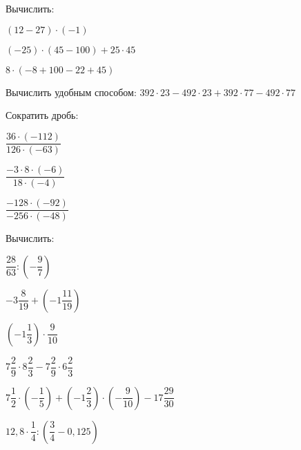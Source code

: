 \begin{listofex}
	\item Вычислить:
	\begin{enumcols}[itemcolumns=3]
		\item \( (12-27)\cdot(-1) \)
		\item \( (-25)\cdot(45-100)+25\cdot45 \)
		\item \( 8\cdot(-8+100-22+45) \)
	\end{enumcols}
	\item Вычислить удобным способом: \( 392\cdot23-492\cdot23+392\cdot77-492\cdot77 \)
	\item Сократить дробь:
	\begin{enumcols}[itemcolumns=3]
		\item \( \dfrac{36\cdot(-112)}{126\cdot(-63)} \)
		\item \( \dfrac{-3\cdot8\cdot(-6)}{18\cdot(-4)}\)
		\item \( \dfrac{-128\cdot(-92)}{-256\cdot(-48)} \)
	\end{enumcols}
	\item Вычислить:
	\begin{enumcols}[itemcolumns=2]
		\item \( \dfrac{28}{63}:\left( -\dfrac{9}{7} \right) \)
		\item \( -3\dfrac{8}{19}+\left( -1\dfrac{11}{19} \right) \)
		\item \( \left( -1\dfrac{1}{3} \right)\cdot\dfrac{9}{10} \)
		\item \( 7\dfrac{2}{9}\cdot8\dfrac{2}{3}-7\dfrac{2}{9}\cdot6\dfrac{2}{3} \)
		\item \( 7\dfrac{1}{2}\cdot\left( -\dfrac{1}{5} \right)+\left( -1\dfrac{2}{3} \right)\cdot\left( -\dfrac{9}{10} \right)-17\dfrac{29}{30} \)
		\item \( 12,8\cdot\dfrac{1}{4}:\left( \dfrac{3}{4}-0,125 \right) \)
	\end{enumcols}
\end{listofex}